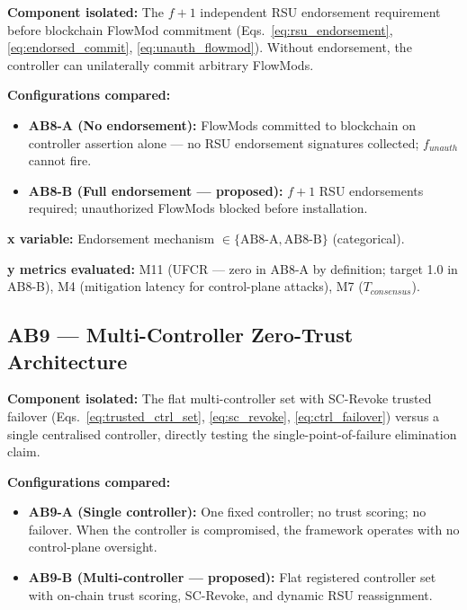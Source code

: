 \documentclass[12pt, a4paper]{report}
\begin{document}
{{\textbf{Component isolated:}
The $f{+}1$ independent \ac{RSU} endorsement requirement
before blockchain FlowMod commitment
(Eqs.~\ref{eq:rsu_endorsement},
\ref{eq:endorsed_commit}, \ref{eq:unauth_flowmod}).
Without endorsement, the controller can unilaterally
commit arbitrary FlowMods.

\textbf{Configurations compared:}
\begin{itemize}
    \item \textbf{AB8-A (No endorsement):}
    FlowMods committed to blockchain on controller
    assertion alone — no RSU endorsement signatures
    collected; $f_{unauth}$ cannot fire.
    \item \textbf{AB8-B (Full endorsement —
    proposed):} $f{+}1$ RSU endorsements required;
    unauthorized FlowMods blocked before installation.
\end{itemize}

\textbf{x variable:} Endorsement mechanism
$\in \{\text{AB8-A}, \text{AB8-B}\}$ (categorical).

\textbf{y metrics evaluated:} M11 (UFCR — zero in
AB8-A by definition; target 1.0 in AB8-B), M4
(mitigation latency for control-plane attacks),
M7 ($T_{consensus}$).


\subsection{AB9 — Multi-Controller Zero-Trust
Architecture}
\label{sec:ab9}

\textbf{Component isolated:}
The flat multi-controller set with SC-Revoke trusted
failover (Eqs.~\ref{eq:trusted_ctrl_set},
\ref{eq:sc_revoke}, \ref{eq:ctrl_failover}) versus
a single centralised controller, directly testing the
single-point-of-failure elimination claim.

\textbf{Configurations compared:}
\begin{itemize}
    \item \textbf{AB9-A (Single controller):}
    One fixed controller; no trust scoring; no failover.
    When the controller is compromised, the framework
    operates with no control-plane oversight.
    \item \textbf{AB9-B (Multi-controller —
    proposed):} Flat registered controller set with
    on-chain trust scoring, SC-Revoke, and dynamic
    RSU reassignment.
\end{itemize}

}}
\end{document}
